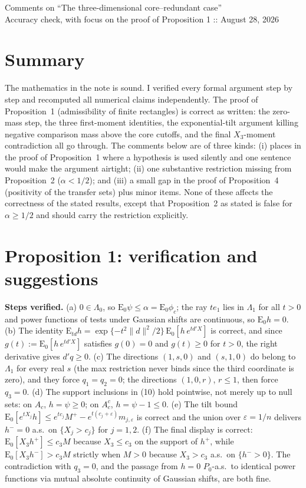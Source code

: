 \documentclass[12pt]{article}
\newcommand{\E}{\mathrm{E}}
\begin{document}
\begin{center}
{\Large Comments on ``The three-dimensional core--redundant case''}\\[3pt]
{\small Accuracy check, with focus on the proof of Proposition 1 :: August 28, 2026}
\end{center}

\medskip

\section*{Summary}

The mathematics in the note is sound. I verified every formal argument
step by step and recomputed all numerical claims independently. The proof
of Proposition~1 (admissibility of finite rectangles) is correct as
written: the zero-mass step, the three first-moment identities, the
exponential-tilt argument killing negative comparison mass above the core
cutoffs, and the final $X_3$-moment contradiction all go through. The
comments below are of three kinds: (i) places in the proof of
Proposition~1 where a hypothesis is used silently and one sentence would
make the argument airtight; (ii) one substantive restriction missing from
Proposition~2 ($\alpha<1/2$); and (iii) a small gap in the proof of
Proposition~4 (positivity of the transfer sets) plus minor items. None of
these affects the correctness of the stated results, except that
Proposition~2 as stated is false for $\alpha\ge1/2$ and should carry the
restriction explicitly.

\section{Proposition 1: verification and suggestions}

\textbf{Steps verified.} (a) $0\in\Lambda_0$, so $\E_0\psi\le\alpha=
\E_0\phi_c$; the ray $te_1$ lies in $\Lambda_1$ for all $t>0$ and power
functions of tests under Gaussian shifts are continuous, so $\E_0h=0$.
(b) The identity $\E_{td}h=\exp\{-t^2\|d\|^2/2\}\,\E_0[h\,e^{td'X}]$ is
correct, and since $g(t):=\E_0[h\,e^{td'X}]$ satisfies $g(0)=0$ and
$g(t)\ge0$ for $t>0$, the right derivative gives $d'q\ge0$. (c) The
directions $(1,s,0)$ and $(s,1,0)$ do belong to $\Lambda_1$ for every
real $s$ (the max restriction never binds since the third coordinate is
zero), and they force $q_1=q_2=0$; the directions $(1,0,r)$, $r\le1$,
then force $q_3=0$. (d) The support inclusions in (10) hold pointwise,
not merely up to null sets: on $A_c$, $h=\psi\ge0$; on $A_c^c$,
$h=\psi-1\le0$. (e) The tilt bound
$\E_0[e^{tX_j}h]\le e^{tc_j}M^+-e^{t(c_j+\varepsilon)}m_{j,\varepsilon}$
is correct and the union over $\varepsilon=1/n$ delivers
$h^-=0$ a.s.\ on $\{X_j>c_j\}$ for $j=1,2$. (f) The final display is
correct: $\E_0[X_3h^+]\le c_3M$ because $X_3\le c_3$ on the support of
$h^+$, while $\E_0[X_3h^-]>c_3M$ strictly when $M>0$ because $X_3>c_3$
a.s.\ on $\{h^->0\}$. The contradiction with $q_3=0$, and the passage
from $h=0$ $P_0$-a.s.\ to identical power functions via mutual absolute
continuity of Gaussian shifts, are both fine.
\end{document}

